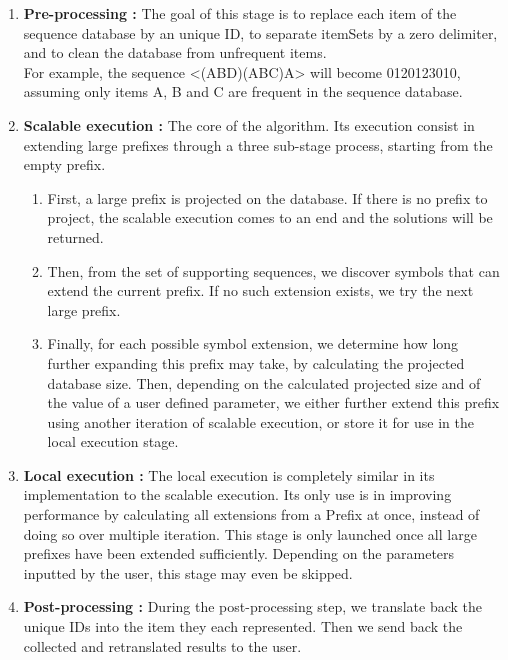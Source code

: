 \documentclass{eplmastersthesis}
\begin{document}
\begin{enumerate}
\item \textbf{Pre-processing :} The goal of this stage is to replace each item of the sequence database by an unique ID, to separate itemSets by a zero delimiter, and to clean the database from unfrequent items. \\
For example, the sequence <(ABD)(ABC)A> will become 0120123010, assuming only items A, B and C are frequent in the sequence database.
\item \textbf{Scalable execution :} The core of the algorithm. Its execution consist in extending large prefixes through a three sub-stage process, starting from the empty prefix.
	\begin{enumerate}
	\item First, a large prefix is projected on the database. If there is no prefix to project, the scalable execution comes to an end and the solutions will be returned.
	\item Then, from the set of supporting sequences, we discover symbols that can extend the current prefix. If no such extension exists, we try the next large prefix.
	\item Finally, for each possible symbol extension, we determine how long further expanding this prefix may take, by calculating the projected database size. Then, depending on the calculated projected size and of the value of a user defined parameter, we either further extend this prefix using another iteration of scalable execution, or store it for use in the local execution stage. 
	\end{enumerate}
\item \textbf{Local execution :} The local execution is completely similar in its implementation to the scalable execution. Its only use is in improving performance by calculating all extensions from a Prefix at once, instead of doing so over multiple iteration. This stage is only launched once all large prefixes have been extended sufficiently. Depending on the parameters inputted by the user, this stage may even be skipped.
\item \textbf{Post-processing :} During the post-processing step, we translate back the unique IDs into the item they each represented. Then we send back the collected and retranslated results to the user.
\end{enumerate}
\end{document}

